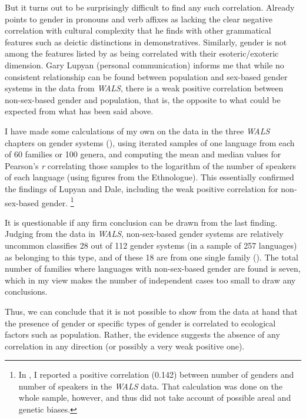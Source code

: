 \documentclass[output=collectionpaper]{langsci/langscibook}
\begin{document}
But it turns out to be surprisingly difficult to find any such correlation. Already \citet[157]{Perkins1992} points to gender in pronouns and verb affixes as lacking the clear negative correlation with cultural complexity that he finds with other grammatical features such as deictic distinctions in demonstratives. Similarly, gender is not among the features listed by \citet{Lupyan2010} as being correlated with their esoteric/exoteric dimension. Gary Lupyan (personal communication) informs me that while no consistent relationship can be found between population and sex-based gender systems in the data from \textit{WALS}, there is a weak positive correlation between non-sex-based gender and population, that is, the opposite to what could be expected from what has been said above.

I have made some calculations of my own on the data in the three \textit{WALS} chapters on gender systems (\citealt{Corbett2013,Corbett2013a,Corbett2013b}), using iterated samples of one language from each of 60 families or 100 genera, and computing the mean and median values for Pearson’s \textit{r} correlating those samples to the logarithm of the number of speakers of each language (using figures from the Ethnologue). This essentially confirmed the findings of Lupyan and Dale, including the weak positive correlation for non-sex-based gender.%
\footnote{In \citet{Dahl2011}, I reported a positive correlation (0.142) between number of genders and number of speakers in the \textit{WALS} data. That calculation was done on the whole sample, however, and thus did not take account of possible areal and genetic biases.}

It is questionable if any firm conclusion can be drawn from the last finding. Judging from the data in \textit{WALS}, non-sex-based gender systems are relatively uncommon \textendash{} \citet{Corbett2013b} classifies 28 out of 112 gender systems (in a sample of 257 languages) as belonging to this type, and of these 18 are from one single family (). The total number of families where languages with non-sex-based gender are found is seven, which in my view makes the number of independent cases too small to draw any conclusions.

Thus, we can conclude that it is not possible to show from the data at hand that the presence of gender \textendash{} or specific types of gender \textendash{} is correlated to ecological factors such as population. Rather, the evidence suggests the absence of any correlation in any direction (or possibly a very weak positive one).
\end{document}
